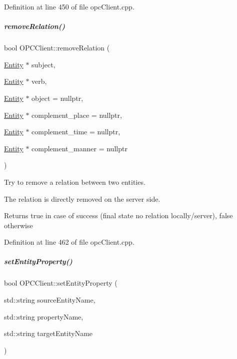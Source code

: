 Definition at line 450 of file opc\+Client.\+cpp.

\mbox{\label{group__icubclient__clients_a6875420cc0976a941b47ca639240e896}} 
\subparagraph{\texorpdfstring{remove\+Relation()}{removeRelation()}\hspace{0.1cm}{\footnotesize\ttfamily [2/2]}}
{\footnotesize\ttfamily bool O\+P\+C\+Client\+::remove\+Relation (\begin{DoxyParamCaption}\item[{\hyperlink{group__icubclient__representations_classicubclient_1_1Entity}{Entity} $\ast$}]{subject,  }\item[{\hyperlink{group__icubclient__representations_classicubclient_1_1Entity}{Entity} $\ast$}]{verb,  }\item[{\hyperlink{group__icubclient__representations_classicubclient_1_1Entity}{Entity} $\ast$}]{object = {\ttfamily nullptr},  }\item[{\hyperlink{group__icubclient__representations_classicubclient_1_1Entity}{Entity} $\ast$}]{complement\+\_\+place = {\ttfamily nullptr},  }\item[{\hyperlink{group__icubclient__representations_classicubclient_1_1Entity}{Entity} $\ast$}]{complement\+\_\+time = {\ttfamily nullptr},  }\item[{\hyperlink{group__icubclient__representations_classicubclient_1_1Entity}{Entity} $\ast$}]{complement\+\_\+manner = {\ttfamily nullptr} }\end{DoxyParamCaption})}



Try to remove a relation between two entities. 

The relation is directly removed on the server side. \begin{DoxyReturn}{Returns}
true in case of success (final state no relation locally/server), false otherwise 
\end{DoxyReturn}


Definition at line 462 of file opc\+Client.\+cpp.

\mbox{\label{group__icubclient__clients_a384897adb9f2d8d19e6c6ff6a9e5c946}} 
\subparagraph{\texorpdfstring{set\+Entity\+Property()}{setEntityProperty()}}
{\footnotesize\ttfamily bool O\+P\+C\+Client\+::set\+Entity\+Property (\begin{DoxyParamCaption}\item[{std\+::string}]{source\+Entity\+Name,  }\item[{std\+::string}]{property\+Name,  }\item[{std\+::string}]{target\+Entity\+Name }\end{DoxyParamCaption})}



